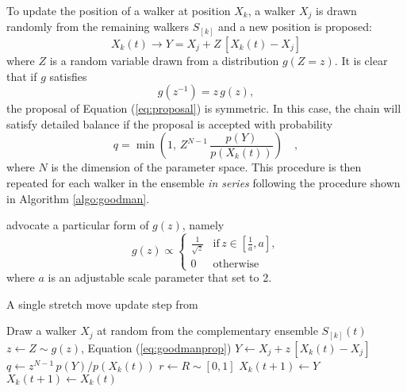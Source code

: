 \documentclass[12pt,preprint]{aastex}
\newcommand{\Eq}[1]{Equation (\ref{eq:#1})}
\newcommand{\eq}[1]{Equation (\ref{eq:#1})}
\newcommand{\eqlabel}[1]{\label{eq:#1}}
\newcommand{\algo}[1]{Algorithm \ref{algo:#1}}
\newcommand{\algolabel}[1]{\label{algo:#1}}
\newcommand{\ensemble}{S}
\renewcommand{\vector}[1]{#1}
\newcommand{\pr}[1]{\ensuremath{p(#1)}}
\begin{document}
To update the position of a walker at position $\vector{X_k}$,
a walker $X_j$ is drawn randomly from the remaining walkers $\ensemble_{[k]}$ and
a new position is proposed:
\begin{equation}
    \eqlabel{proposal}
    \vector{X_k} (t) \to \vector{Y} = \vector{X_j}
            + Z \, [\vector{X_k} (t) - \vector{X_j}]
\end{equation}
where $Z$ is a random variable drawn from a distribution $g(Z = z)$.
It is clear that if $g$ satisfies
\begin{equation}
    g(z^{-1}) = z \, g(z),
\end{equation}
the proposal of \eq{proposal} is symmetric. In this case, the chain will
satisfy detailed balance if the proposal is accepted with probability
\begin{equation}
    \eqlabel{acceptance}
    q = \min \left( 1,\, Z^{N-1} \,
                \frac{\pr{\vector{Y}}}{\pr{\vector{X_k} (t)}} \right) \quad,
\end{equation}
where $N$ is the dimension of the parameter space. This procedure is then
repeated for each walker in the ensemble \emph{in series} following the
procedure shown in \algo{goodman}.

 advocate a particular form of $g(z)$, namely
\begin{equation}
    \eqlabel{goodmanprop}
    g(z) \propto \left \{ \begin{array}{ll}
        \displaystyle\frac{1}{\sqrt{z}} & \mathrm{if}\, z\in
                        \left [ \displaystyle\frac{1}{a}, a \right ], \\
        0 & \mathrm{otherwise}
    \end{array} \right .
\end{equation}
where $a$ is an adjustable scale parameter that  set
to 2.

\nonumberparagraphs

\begin{algorithm}
\caption{A single stretch move update step from 
    \algolabel{goodman}}
\begin{algorithmic}[1]
    \STATE Draw a walker $X_j$ at random from the complementary ensemble %
        $\ensemble_{[k]}(t)$
    \STATE $z \gets Z \sim g(z)$, \Eq{goodmanprop}
    \STATE $\vector{Y} \gets \vector{X_j} %
                + z \, [ \vector{X_k} (t) - \vector{X_j}]$
    \STATE $q \gets z^{N-1} \, p(Y)/p(X_k(t))$ \label{line:hard}%
        \hspace{1cm}{\footnotesize\it // This line is generally expensive}
    \STATE $r \gets R \sim [0, 1]$
    \IF{$r \ge q$, \eq{acceptance}}
        \STATE $X_k(t+1) \gets Y$
    \ELSE
        \STATE $X_k(t+1) \gets X_k(t)$
    \ENDIF
\ENDFOR
\end{algorithmic}
\end{algorithm}
\end{document}
